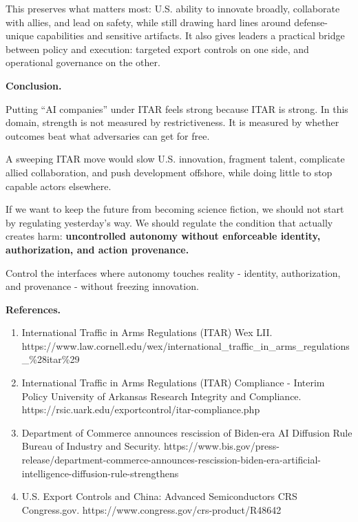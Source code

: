 \documentclass[11pt]{article}
\begin{document}
This preserves what matters most: U.S. ability to innovate broadly,
collaborate with allies, and lead on safety, while still drawing hard
lines around defense-unique capabilities and sensitive artifacts. It
also gives leaders a practical bridge between policy and execution:
targeted export controls on one side, and operational governance on the
other.

\textbf{Conclusion.}

Putting ``AI companies'' under ITAR feels strong because ITAR is strong.
In this domain, strength is not measured by restrictiveness. It is
measured by whether outcomes beat what adversaries can get for free.

A sweeping ITAR move would slow U.S. innovation, fragment talent,
complicate allied collaboration, and push development offshore, while
doing little to stop capable actors elsewhere.

If we want to keep the future from becoming science fiction, we should
not start by regulating yesterday's way. We should regulate the
condition that actually creates harm: \textbf{uncontrolled autonomy
without enforceable identity, authorization, and action provenance.}

Control the interfaces where autonomy touches reality - identity,
authorization, and provenance - without freezing innovation.

\textbf{References.}

\begin{enumerate}
\def\labelenumi{\arabic{enumi}.}
\tightlist
\item
  International Traffic in Arms Regulations (ITAR) \textbar{} Wex
  \textbar{} LII.
  https://www.law.cornell.edu/wex/international\_traffic\_in\_arms\_regulations\_\%28itar\%29
\item
  International Traffic in Arms Regulations (ITAR) Compliance - Interim
  Policy \textbar{} University of Arkansas Research Integrity and
  Compliance. https://rsic.uark.edu/exportcontrol/itar-compliance.php
\item
  Department of Commerce announces rescission of Biden-era AI Diffusion
  Rule \textbar{} Bureau of Industry and Security.
  https://www.bis.gov/press-release/department-commerce-announces-rescission-biden-era-artificial-intelligence-diffusion-rule-strengthens
\item
  U.S. Export Controls and China: Advanced Semiconductors \textbar{} CRS
  \textbar{} Congress.gov. https://www.congress.gov/crs-product/R48642
\end{enumerate}
\end{document}
